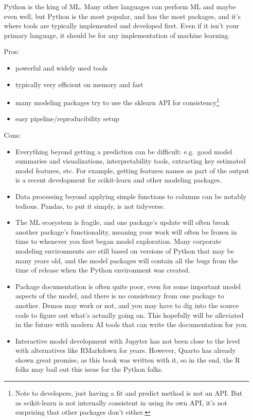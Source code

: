 \documentclass[
  letterpaper,
]{krantz}
\providecommand{\tightlist}{%
  \setlength{\itemsep}{0pt}\setlength{\parskip}{0pt}}\usepackage{longtable,booktabs,array}
\begin{document}
Python is the king of ML. Many other languages can perform ML and maybe
even well, but Python is the most popular, and has the most packages,
and it's where tools are typically implemented and developed first. Even
if it isn't your primary language, it should be for any implementation
of machine learning.

Pros:

\begin{itemize}
\tightlist
\item
  powerful and widely used tools
\item
  typically very efficient on memory and fast
\item
  many modeling packages try to use the sklearn API for
  consistency\footnote{Note to developers, just having a fit and predict
    method is not an API. But as scikit-learn is not internally
    consistent in using its own API, it's not surprising that other
    packages don't either.}
\item
  easy pipeline/reproducibility setup
\end{itemize}

Cons:

\begin{itemize}
\tightlist
\item
  Everything beyond getting a prediction can be difficult: e.g.~good
  model summaries and visualizations, interpretability tools, extracting
  key estimated model features, etc. For example, getting features names
  as part of the output is a recent development for scikit-learn and
  other modeling packages.
\item
  Data processing beyond applying simple functions to columns can be
  notably tedious. Pandas, to put it simply, is not tidyverse.
\item
  The ML ecosystem is fragile, and one package's update will often break
  another package's functionality, meaning your work will often be
  frozen in time to whenever you first began model exploration. Many
  corporate modeling environments are still based on versions of Python
  that may be many years old, and the model packages will contain all
  the bugs from the time of release when the Python environment was
  created.
\item
  Package documentation is often quite poor, even for some important
  model aspects of the model, and there is no consistency from one
  package to another. Demos may work or not, and you may have to dig
  into the source code to figure out what's actually going on. This
  hopefully will be alleviated in the future with modern AI tools that
  can write the documentation for you.
\item
  Interactive model development with Jupyter has not been close to the
  level with alternatives like RMarkdown for years. However, Quarto has
  already shown great promise, as this book was written with it, so in
  the end, the R folks may bail out this issue for the Python folks.
\end{itemize}
\end{document}
